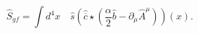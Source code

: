 \begin{equation}
\widehat{S}_{gf}=\int d^{4}x\quad \widehat{s}\left( \widehat{\overline{c}}%
\star \left( \frac{\alpha }{2}\widehat{b}-\partial _{\mu }\widehat{A}^{\mu
}\right) \right) \left( x\right) . 
\end{equation}

